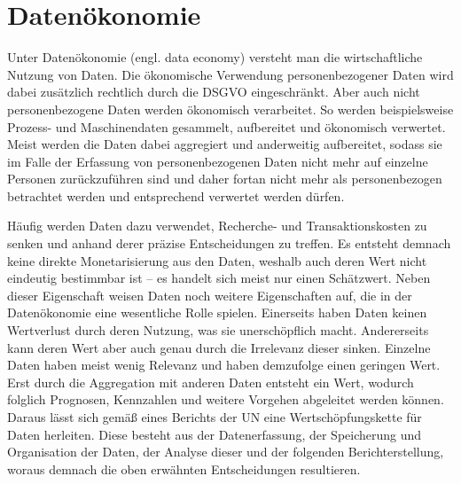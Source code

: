 \section{Datenökonomie} \label{datenoekonomie}
Unter Datenökonomie (engl. data economy) versteht man die wirtschaftliche Nutzung von Daten. Die ökonomische Verwendung personenbezogener Daten wird dabei zusätzlich rechtlich durch die DSGVO eingeschränkt. Aber auch nicht personenbezogene Daten werden ökonomisch verarbeitet. So werden beispielsweise Prozess- und Maschinendaten gesammelt, aufbereitet und ökonomisch verwertet. \cite{bpb_2019} Meist werden die Daten dabei aggregiert und anderweitig aufbereitet, sodass sie im Falle der Erfassung von personenbezogenen Daten nicht mehr auf einzelne Personen zurückzuführen sind und daher fortan nicht mehr als personenbezogen betrachtet werden und entsprechend verwertet werden dürfen. \newline

\noindent Häufig werden Daten dazu verwendet, Recherche- und Transaktionskosten zu senken und anhand derer präzise Entscheidungen zu treffen. 
Es entsteht demnach keine direkte Monetarisierung aus den Daten, weshalb auch deren Wert nicht eindeutig bestimmbar ist -- es handelt sich meist nur einen Schätzwert. Neben dieser Eigenschaft weisen Daten noch weitere Eigenschaften auf, die in der Datenökonomie eine wesentliche Rolle spielen. Einerseits haben Daten keinen Wertverlust durch deren Nutzung, was sie unerschöpflich macht. Andererseits kann deren Wert aber auch genau durch die Irrelevanz dieser sinken. Einzelne Daten haben meist wenig Relevanz und haben demzufolge einen geringen Wert. Erst durch die Aggregation mit anderen Daten entsteht ein Wert, wodurch folglich Prognosen, Kennzahlen und weitere Vorgehen abgeleitet werden können. Daraus lässt sich gemäß eines Berichts der \gls{UN} eine Wertschöpfungskette für Daten herleiten. Diese besteht aus der Datenerfassung, der Speicherung und Organisation der Daten, der Analyse dieser und der folgenden Berichterstellung, woraus demnach die oben erwähnten Entscheidungen resultieren. \cite{un_2019} \newline

